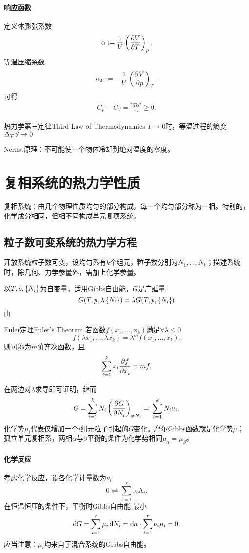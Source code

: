 \paragraph*{响应函数}定义体膨张系数
\begin{align}
	\alpha:=\frac1V\left(\frac{\partial^{\;\!\!}V}{\partial T^{\;\!\!}}\right)_p.
\end{align}
等温压缩系数
\begin{align}
	\kappa_T:=-\frac1V\left(\frac{\partial^{\;\!\!}V}{\partial p^{\;\!\!}}\right)_T.
\end{align}
可得
\begin{align}
	C_p-C_V=\frac{VT\alpha^2}{\kappa_T}\geqslant 0.
\end{align}
\begin{theorem}{热力学第三定律}{Third Law of Thermodynamics}
	$T\to 0$时，等温过程的熵变$\Delta_TS\to 0$

	Nernst原理：不可能使一个物体冷却到绝对温度的零度。
\end{theorem}

\clearpage
\section{复相系统的热力学性质}
复相系统：由几个物理性质均匀的部分构成，每一个均匀部分称为一相。特别的，化学成分相同，但相不同构成单元复项系统。
\subsection{粒子数可变系统的热力学方程}
开放系统粒子数可变，设均匀系有$k$个组元，粒子数分别为$N_1,\ldots,N_k$；描述系统时，除几何、力学参量外，需加上化学参量。

以$T,p,\left\{N_i\right\}$为自变量，适用Gibbs自由能，$G$是广延量
\[G(T,p,\lambda\left\{N_i\right\})=\lambda G(T,p,\left\{N_i\right\})\]
由
\begin{theorem}{Euler定理}{Euler's Theorem}
	若函数$f(x_1,\ldots,x_k)$满足$\forall\lambda\leqslant 0$
	\[f(\lambda x_1,\ldots,\lambda x_k)=\lambda^mf(x_1,\ldots,x_k).\]
	则可称为$m$阶齐次函数，且
	\[\sum_{i=1}^kx_i\frac{\partial^{\;\!\!}f}{\partial x_i^{\;\!\!}}=mf.\]
\end{theorem}
在两边对$\lambda$求导即可证明，继而
\[G=\sum_{i=1}^kN_i\left(\frac{\partial^{\;\!\!}G}{\partial N_i^{\;\!\!}}\right)_{\neq N_i}=:\sum_{i=1}^kN_i\mu_i.\]
化学势$\mu_i$代表仅增加一个$i$组元粒子引起的$G$变化。摩尔Gibbs函数就是化学势$\mu$；孤立单元复相系，两相$\alpha$与$\beta$平衡的条件为化学势相同$\mu_\alpha=\mu_\beta$。
\paragraph*{化学反应}
考虑化学反应，设各化学计量数为$\nu_i$
\[0\rightleftharpoons\sum_{i=1}^r\nu_i{\mathrm A}_i.\]
在恒温恒压的条件下，平衡时Gibbs自由能%
最小
\begin{align}
	\mathop{}\!\mathrm{d} G=\sum_{i=1}^r\mu_i\mathop{}\!\mathrm{d} N_i=\mathop{}\!\mathrm{d} n\cdot\sum_{i=1}^r\nu_i\mu_i=0.
\end{align}
应当注意：$\mu_i$均来自于混合系统的Gibbs自由能。

